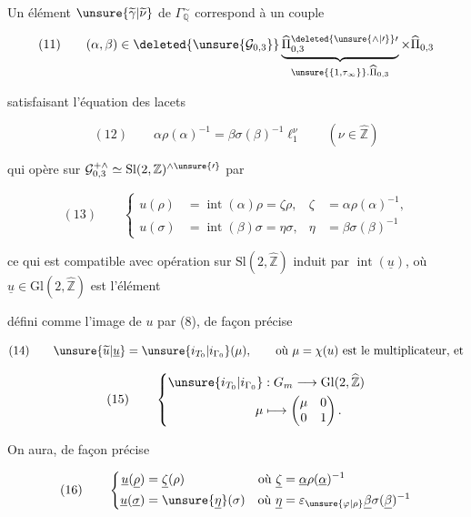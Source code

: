 Un élément $\unsure{\widetilde{\gamma}|\widetilde{\nu}}$ de
$\Gamma_{\mathbb Q}^{\sim}$ correspond à un couple

\[
(11)\qquad
(\alpha,\beta)\in
\deleted{\unsure{\mathcal{G}_{0,3}}}
\underbrace{\widehat{\Pi}_{0,3}^{\deleted{\unsure{\wedge|\prime}}\prime}}_{
 \unsure{\{1,\tau_\infty\}}.\widehat{\Pi}_{0,3}}
\times\widehat{\Pi}_{0,3}
\]

satisfaisant  l'équation des lacets

\[
(12)\qquad
\alpha\rho(\alpha)^{-1}=\beta\sigma(\beta)^{-1}\ell_1^\nu
\qquad (\nu\in\widehat{\mathbb Z})
\]

qui opère sur $\mathcal{G}_{0,3}^{+\wedge}\simeq
\mathrm{Sl}(2,\mathbb Z)^{\wedge\unsure{\prime}}$ par

\[
(13)\qquad
\left\{\begin{aligned}
u(\rho)&=\operatorname{int}(\alpha)\rho=\zeta\rho,
&\zeta&=\alpha\rho(\alpha)^{-1},\\
u(\sigma)&=\operatorname{int}(\beta)\sigma=\eta\sigma,
&\eta&=\beta\sigma(\beta)^{-1}
\end{aligned}\right.
\]

ce qui est compatible avec  opération
sur $\mathrm{Sl}(2,\widehat{\mathbb Z})$ induit
par $\operatorname{int}(\underline{u})$, où
$\underline{u}\in\mathrm{Gl}(2,\widehat{\mathbb Z})$ est l'élément



défini  comme l'image de $u$ par (8), de
façon précise

\[
(14)\qquad
\unsure{\widetilde{u}|\underline{u}}=
\unsure{i_{T_0}|i_{\Gamma_0}}(\mu),\qquad
\text{où }\mu=\chi(u)\text{ est le multiplicateur, et}
\]

\[
(15)\qquad
\left\{\begin{aligned}
\unsure{i_{T_0}|i_{\Gamma_0}} &:G_m\longrightarrow
\mathrm{Gl}(2,\widehat{\mathbb Z})\\
\mu&\longmapsto\begin{pmatrix}\mu&0\\0&1\end{pmatrix}.
\end{aligned}\right.
\]

On aura, de façon précise

\[
(16)\qquad
\left\{\begin{aligned}
\underline{u}(\underline{\rho})&=\underline{\zeta}(\rho)
&\text{où }\underline{\zeta}&=\underline{\alpha}\rho(\underline{\alpha})^{-1}\\
\underline{u}(\underline{\sigma})&=\unsure{\underline{\eta}}(\sigma)
&\text{où }\underline{\eta}&=\varepsilon_{\unsure{\varphi|\rho}}
\underline{\beta}\sigma(\underline{\beta})^{-1}
\end{aligned}\right.
\]

